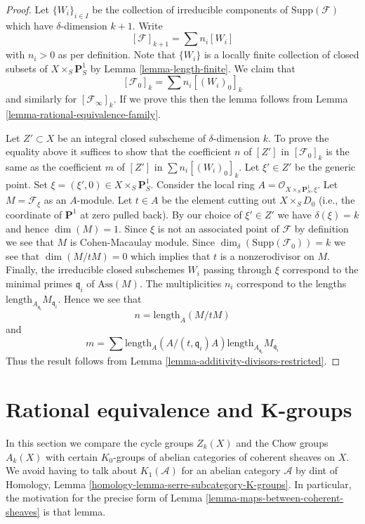 \begin{proof}
Let $\{W_i\}_{i \in I}$ be the collection of irreducible
components of $\text{Supp}(\mathcal{F})$
which have $\delta$-dimension $k + 1$.
Write
$$
[\mathcal{F}]_{k + 1} = \sum n_i[W_i]
$$
with $n_i > 0$ as per definition. Note that $\{W_i\}$
is a locally finite collection of closed subsets of
$X \times_S \mathbf{P}^1_S$ by Lemma \ref{lemma-length-finite}.
We claim that
$$
[\mathcal{F}_0]_k = \sum n_i[(W_i)_0]_k
$$
and similarly for $[\mathcal{F}_\infty]_k$. If we prove this then the lemma
follows from Lemma \ref{lemma-rational-equivalence-family}.

\medskip\noindent
Let $Z' \subset X$ be an integral closed subscheme of $\delta$-dimension $k$.
To prove the equality above it suffices to show that the coefficient $n$
of $[Z']$ in $[\mathcal{F}_0]_k$ is the same as the coefficient $m$ of
$[Z']$ in $\sum n_i[(W_i)_0]_k$. Let $\xi' \in Z'$ be the generic point.
Set $\xi = (\xi', 0) \in  X \times_S \mathbf{P}^1_S$.
Consider the local ring $A = \mathcal{O}_{X \times_S \mathbf{P}^1_S, \xi}$.
Let $M = \mathcal{F}_\xi$ as an $A$-module.
Let $t \in A$ be the element cutting out $X \times_S D_0$
(i.e., the coordinate of $\mathbf{P}^1$ at zero pulled back).
By our choice of $\xi' \in Z'$ we have $\delta(\xi) = k$
and hence $\dim(M) = 1$. Since $\xi$ is not an associated point
of $\mathcal{F}$ by definition we see that $M$ is Cohen-Macaulay module.
Since $\dim_\delta(\text{Supp}(\mathcal{F}_0)) = k$
we see that $\dim(M/tM) = 0$ which implies that $t$
is a nonzerodivisor on $M$. Finally, the irreducible closed subschemes
$W_i$ passing through $\xi$ correspond to the minimal primes
$\mathfrak q_i$ of $\text{Ass}(M)$. The multiplicities $n_i$ correspond
to the lengths $\text{length}_{A_{\mathfrak q_i}}M_{\mathfrak q_i}$.
Hence we see that
$$
n = \text{length}_A(M/tM)
$$
and
$$
m = \sum
\text{length}_A(A/(t, \mathfrak q_i)A)
\text{length}_{A_{\mathfrak q_i}}M_{\mathfrak q_i}
$$
Thus the result follows from
Lemma \ref{lemma-additivity-divisors-restricted}.
\end{proof}





\section{Rational equivalence and K-groups}
\label{section-rational-equivalence-K-groups}

\noindent
In this section we compare the cycle groups $Z_k(X)$ and
the Chow groups $A_k(X)$ with certain $K_0$-groups of
abelian categories of coherent sheaves on $X$. We avoid having
to talk about $K_1(\mathcal{A})$ for an abelian category
$\mathcal{A}$ by dint of
Homology, Lemma \ref{homology-lemma-serre-subcategory-K-groups}.
In particular, the motivation for the precise form of
Lemma \ref{lemma-maps-between-coherent-sheaves} is that lemma.

